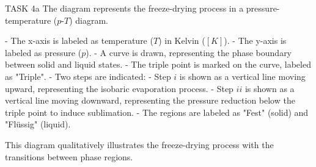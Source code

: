 TASK 4a  
The diagram represents the freeze-drying process in a pressure-temperature (\(p\)-\(T\)) diagram.  

- The x-axis is labeled as temperature (\(T\)) in Kelvin (\([K]\)).  
- The y-axis is labeled as pressure (\(p\)).  
- A curve is drawn, representing the phase boundary between solid and liquid states.  
- The triple point is marked on the curve, labeled as "Triple".  
- Two steps are indicated:  
  - Step \(i\) is shown as a vertical line moving upward, representing the isobaric evaporation process.  
  - Step \(ii\) is shown as a vertical line moving downward, representing the pressure reduction below the triple point to induce sublimation.  
- The regions are labeled as "Fest" (solid) and "Flüssig" (liquid).  

This diagram qualitatively illustrates the freeze-drying process with the transitions between phase regions.